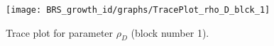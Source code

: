 \begin{figure}[H]
\centering
  \texttt{[image: BRS\_growth\_id/graphs/TracePlot\_rho\_D\_blck\_1]}\\
    \caption{Trace plot for parameter ${\rho_D}$ (block number 1).}
\end{figure}
